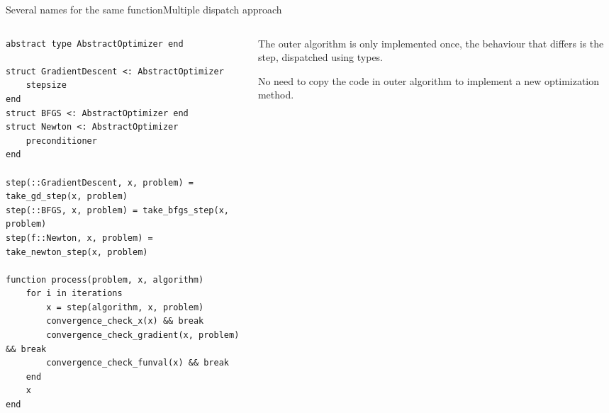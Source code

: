 \begin{frame}[fragile]{Several names for the same function}{Multiple dispatch approach}
        \begin{columns}
     	\begin{column}{0.8\textwidth}
            \begin{verbatim}
abstract type AbstractOptimizer end

struct GradientDescent <: AbstractOptimizer
    stepsize
end
struct BFGS <: AbstractOptimizer end
struct Newton <: AbstractOptimizer
    preconditioner
end

step(::GradientDescent, x, problem) = take_gd_step(x, problem)
step(::BFGS, x, problem) = take_bfgs_step(x, problem)
step(f::Newton, x, problem) = take_newton_step(x, problem)

function process(problem, x, algorithm)
    for i in iterations
        x = step(algorithm, x, problem)
        convergence_check_x(x) && break
        convergence_check_gradient(x, problem) && break
        convergence_check_funval(x) && break
    end
    x
end
            \end{verbatim}
\end{column}
\hspace{-7mm}
\begin{column}{0.4\textwidth}
 The outer algorithm is only implemented once, the behaviour
that differs is the step, dispatched using types.

\vspace{3mm}
No need to copy the code in outer algorithm to implement a new optimization method.
\end{column}
\end{columns}

\end{frame}




